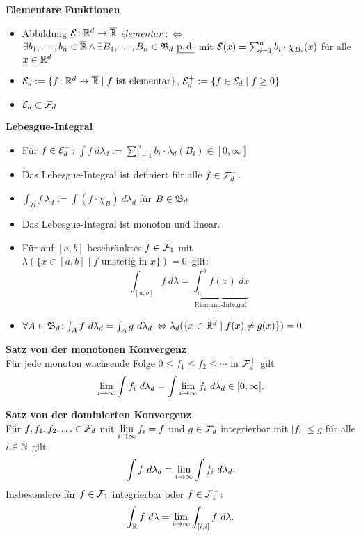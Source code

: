 \textbf{Elementare Funktionen}
\begin{itemize}

\item Abbildung $\mathcal{E}\!: \mathbb{R}^d \to \overline{\mathbb{R}}$ \textit{elementar} $:\Leftrightarrow$\\
  $\exists b_1,\ldots,b_n\in\overline{\mathbb{R}} \wedge \exists B_1,\ldots,B_n\in\mathfrak{B}_d\
  \underline{\operatorname{p.d.}}$ mit $\mathcal{E}(x) = \sum_{i=1}^{n} b_i \cdot \chi_{B_i}(x)$ für alle $x\in\mathbb{R}^d$

\item $\mathcal{E}_d := \{f\!: \mathbb{R}^d \to \overline{\mathbb{R}} \mid f \text{ ist elementar}\}$,
  $\mathcal{E}_d^+ := \{f\in\mathcal{E}_d \mid f\geq 0\}$

\item $\mathcal{E}_d \subset \mathcal{F}_d$
\end{itemize}

\textbf{Lebesgue-Integral}
\begin{itemize}
\item Für $f\in\mathcal{E}_d^+$:
  $\int f~d\lambda_d := \sum_{i=1}^{n} b_i \cdot \lambda_d(B_i) \in [0,\infty]$

\item Das Lebesgue-Integral ist definiert für alle $f\in\mathcal{F}_d^+$.

\item $\int_B f~\lambda_d := \int (f\cdot \chi_B)~d\lambda_d$ für $B\in\mathfrak{B}_d$

\item Das Lebesgue-Integral ist monoton und linear.

\item Für auf $[a,b]$ beschränktes $f \in \mathcal{F}_1$ mit
  \mbox{$\lambda(\{x\in[a,b] \mid f \text{ unstetig in }x\}) = 0$ gilt:}
  \[
    \int_{[a,b]} f~d\lambda =
    \underbrace{\int_{a}^{b}f(x)~dx}_{\text{Riemann-Integral}}
  \]

\item $\forall A\in\mathfrak{B}_d\!: \int_A f~d\lambda_d = \int_A g~d\lambda_d$
  $\Leftrightarrow \lambda_d(\{x\in\mathbb{R}^d \mid f(x) \neq g(x)\}) = 0$
\end{itemize}

\textbf{Satz von der monotonen Konvergenz}\\
Für jede monoton wachsende Folge $0 \leq f_1 \leq f_2 \leq \cdots$
in $\mathcal{F}_d^+$ gilt
\[
  \lim\limits_{i\to\infty}\int f_i~d\lambda_d =
  \int\lim\limits_{i\to\infty} f_i~d\lambda_d \in [0,\infty].
\]

\textbf{Satz von der dominierten Konvergenz}\\
Für $f,f_1,f_2,\ldots\in\mathcal{F}_d$ mit $\lim\limits_{i\to\infty} f_i = f$
und $g\in\mathcal{F}_d$ integrierbar mit $|f_i| \leq g$ für alle $i\in\mathbb{N}$ gilt
\[
  \int f~d\lambda_d = \lim\limits_{i\to\infty} \int f_i~d\lambda_d.
\]
Insbesondere für $f\in\mathcal{F}_1$ integrierbar oder $f\in\mathcal{F}_1^+$:
\[
  \int_{\mathbb{R}} f~d\lambda = \lim\limits_{i\to\infty} \int_{[i,i]} f~d\lambda.
\]


